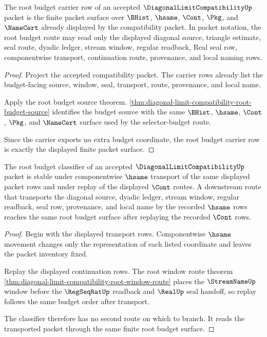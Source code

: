 \begin{theorem}
\label{thm:diagonal-limit-compatibility-root-budget-carrier-row}
The root budget carrier row of an accepted $\DiagonalLimitCompatibilityUp$ packet is the finite packet surface over $\BHist$, $\hsame$, $\Cont$, $\Pkg$, and $\NameCert$ already displayed by the compatibility packet. In packet notation, the root budget route may read only the displayed diagonal source, triangle estimate, seal route, dyadic ledger, stream window, regular readback, Real seal row, componentwise transport, continuation route, provenance, and local naming rows.
\end{theorem}
\begin{proof}
Project the accepted compatibility packet. The carrier rows already list the budget-facing source, window, seal, transport, route, provenance, and local name.

Apply the root budget source theorem. \autoref{thm:diagonal-limit-compatibility-root-budget-source} identifies the budget source with the same $\BHist$, $\hsame$, $\Cont$, $\Pkg$, and $\NameCert$ surface used by the selector-budget route.

Since the carrier exports no extra budget coordinate, the root budget carrier row is exactly the displayed finite packet surface.
\end{proof}

\begin{theorem}
\label{thm:diagonal-limit-compatibility-root-budget-classifier-row}
The root budget classifier of an accepted $\DiagonalLimitCompatibilityUp$ packet is stable under componentwise $\hsame$ transport of the same displayed packet rows and under replay of the displayed $\Cont$ routes. A downstream route that transports the diagonal source, dyadic ledger, stream window, regular readback, seal row, provenance, and local name by the recorded $\hsame$ rows reaches the same root budget surface after replaying the recorded $\Cont$ rows.
\end{theorem}
\begin{proof}
Begin with the displayed transport rows. Componentwise $\hsame$ movement changes only the representation of each listed coordinate and leaves the packet inventory fixed.

Replay the displayed continuation rows. The root window route theorem \autoref{thm:diagonal-limit-compatibility-root-window-route} places the $\StreamNameUp$ window before the $\RegSeqRatUp$ readback and $\RealUp$ seal handoff, so replay follows the same budget order after transport.

The classifier therefore has no second route on which to branch. It reads the transported packet through the same finite root budget surface.
\end{proof}


